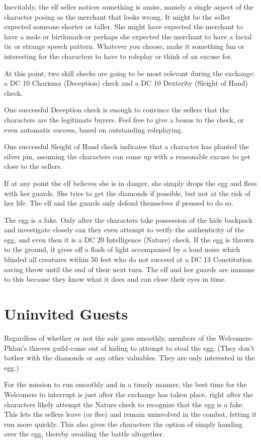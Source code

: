\documentclass[10pt,a4paper,twoside,bg=print,twocolumn,openany,nodeprecatedcode]{dndbook}
\begin{document}
Inevitably, the elf seller notices something is amiss, namely a single aspect of the character posing as the merchant that looks wrong. It might be the seller expected someone shorter or taller. She might have expected the merchant to have a mole or birthmark-or perhaps she expected the merchant to have a facial tic or strange speech pattern. Whatever you choose, make it something fun or interesting for the characters to have to roleplay or think of an excuse for.

At this point, two skill checks are going to be most relevant during the exchange: a DC 10 Charisma (Deception) check and a DC 10 Dexterity (Sleight of Hand) check.

One successful Deception check is enough to convince the sellers that the characters are the legitimate buyers. Feel free to give a bonus to the check, or even automatic success, based on outstanding roleplaying.

One successful Sleight of Hand check indicates that a character has planted the silver pin, assuming the characters can come up with a reasonable excuse to get close to the sellers.

If at any point the elf believes she is in danger, she simply drops the egg and flees with her guards. She tries to get the diamonds if possible, but not at the risk of her life. The elf and the guards only defend themselves if pressed to do so.

The egg is a fake. Only after the characters take possession of the hide backpack and investigate closely can they even attempt to verify the authenticity of the egg, and even then it is a DC 20 Intelligence (Nature) check. If the egg is thrown to the ground, it gives off a flash of light accompanied by a loud noise which blinded all creatures within 50 feet who do not succeed at a DC 13 Constitution saving throw until the end of their next turn. The elf and her guards are immune to this because they know what it does and can close their eyes in time.

\section{Uninvited Guests}
Regardless of whether or not the sale goes smoothly, members of the Welcomers-Phlan's thieves guild-come out of hiding to attempt to steal the egg. (They don't bother with the diamonds or any other valuables. They are only interested in the egg.)

For the mission to run smoothly and in a timely manner, the best time for the Welcomers to interrupt is just after the exchange has taken place, right after the characters likely attempt the Nature check to recognize that the egg is a fake. This lets the sellers leave (or flee) and remain uninvolved in the combat, letting it run more quickly. This also gives the characters the option of simply handing over the egg, thereby avoiding the battle altogether.
\end{document}
